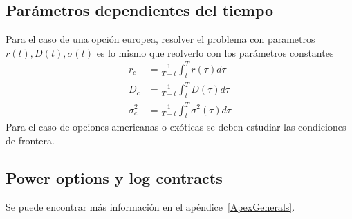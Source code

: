 \subsection{Parámetros dependientes del tiempo}
Para el caso de una opción europea, resolver el problema con parametros $r(t), D(t), \sigma(t)$ es lo mismo que reolverlo con los parámetros constantes
\[
    \boxed{
        \begin{aligned}
            r_c &= \frac{1}{T-t} \int_t^T r(\tau) d\tau \\
            D_c &= \frac{1}{T-t} \int_t^T D(\tau) d\tau \\
            \sigma_c^2 &= \frac{1}{T-t} \int_t^T \sigma^2(\tau) d\tau
        \end{aligned}
    }
\]
Para el caso de opciones americanas o exóticas se deben estudiar las condiciones de frontera.







\subsection{Power options y log contracts}
Se puede encontrar más información en el apéndice~\ref{ApexGenerals}.









